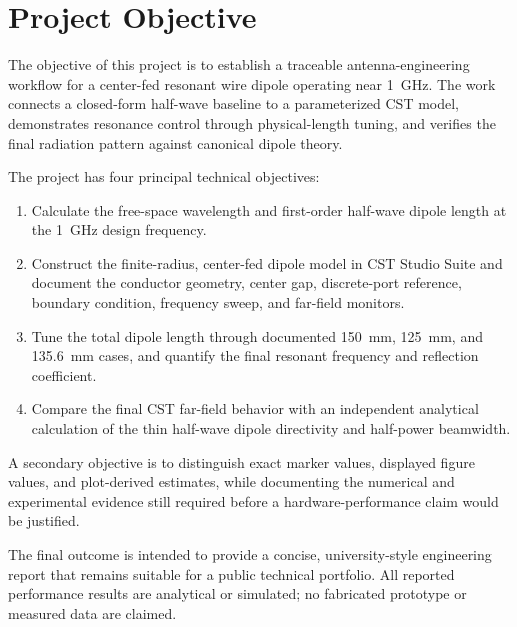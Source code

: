 
\chapter*{Project Objective}
\thispagestyle{fancy}
\begingroup
\setlength{\emergencystretch}{2em}

The objective of this project is to establish a traceable antenna-engineering workflow
for a center-fed resonant wire dipole operating near 1~GHz. The work connects a
closed-form half-wave baseline to a parameterized CST model, demonstrates resonance
control through physical-length tuning, and verifies the final radiation pattern against
canonical dipole theory.

The project has four principal technical objectives:

\begin{enumerate}
    \item Calculate the free-space wavelength and first-order half-wave dipole length at
    the 1~GHz design frequency.

    \item Construct the finite-radius, center-fed dipole model in CST Studio Suite and
    document the conductor geometry, center gap, discrete-port reference, boundary
    condition, frequency sweep, and far-field monitors.

    \item Tune the total dipole length through documented 150~mm, 125~mm, and
    135.6~mm cases, and quantify the final resonant frequency and reflection coefficient.

    \item Compare the final CST far-field behavior with an independent analytical
    calculation of the thin half-wave dipole directivity and half-power beamwidth.
\end{enumerate}

A secondary objective is to distinguish exact marker values, displayed figure values,
and plot-derived estimates, while documenting the numerical and experimental evidence
still required before a hardware-performance claim would be justified.

The final outcome is intended to provide a concise, university-style engineering report
that remains suitable for a public technical portfolio. All reported performance results
are analytical or simulated; no fabricated prototype or measured data are claimed.
\endgroup

